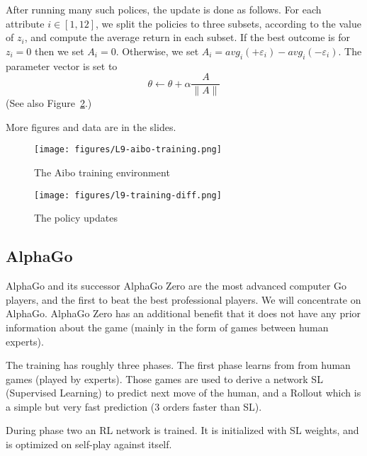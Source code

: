 After running many such polices, the update is done as follows. For
each attribute $i\in[1,12]$, we split the policies to three subsets,
according to the value of $z_i$, and compute the average return in
each subset. If the best outcome is for $z_i=0$ then we set $A_i=0$.
Otherwise, we set $A_i=
avg_i(+\varepsilon_i)-avg_i(-\varepsilon_i)$. The parameter vector
is set to
\[
\theta \leftarrow \theta +\alpha \frac{A}{\|A\|}
\]
(See also Figure~\ref{fig:training-diff}.)

More figures and data are in the slides.



\begin{figure}
  \begin{centering}
\texttt{[image: figures/L9-aibo-training.png]}\\
  \caption{The Aibo training environment }\label{fig:aibo-training}
  \end{centering}
\end{figure}


\begin{figure}
  \begin{centering}
 \texttt{[image: figures/l9-training-diff.png]}\\
  \caption{The policy updates}\label{fig:training-diff}
  \end{centering}
\end{figure}




\subsection{AlphaGo}

AlphaGo and its successor AlphaGo Zero are the most advanced
computer Go players, and the first to beat the best professional
players. We will concentrate on AlphaGo. AlphaGo Zero has an
additional benefit that it does not have any prior information about
the game (mainly in the form of games between human experts).

The training has roughly three phases. The first phase learns from
from human games (played by experts). Those games are used to derive
a network SL (Supervised Learning) to predict next move of the
human, and a Rollout which is a simple but very fast prediction (3
orders faster than SL).

During phase two an RL network is trained. It is initialized with SL
weights, and is optimized on self-play against itself.

